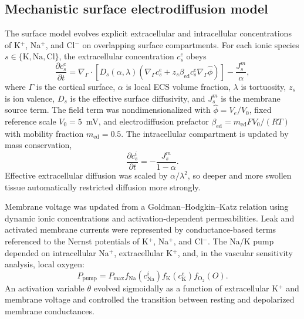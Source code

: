 \documentclass[12pt]{article}
\begin{document}
\subsection{Mechanistic surface electrodiffusion model}

The surface model evolves explicit extracellular and intracellular concentrations of K$^+$, Na$^+$, and Cl$^-$ on overlapping surface compartments. For each ionic species $s \in \{\mathrm{K},\mathrm{Na},\mathrm{Cl}\}$, the extracellular concentration $c_s^{e}$ obeys
\begin{equation}
\frac{\partial c_s^{e}}{\partial t}
= \nabla_{\Gamma}\cdot\left[D_s(\alpha,\lambda)\left(\nabla_{\Gamma} c_s^{e} + z_s \beta_{\mathrm{ed}} c_s^{e}\nabla_{\Gamma}\hat{\phi}\right)\right]
- \frac{J_s^{m}}{\alpha},
\end{equation}
where $\Gamma$ is the cortical surface, $\alpha$ is local ECS volume fraction, $\lambda$ is tortuosity, $z_s$ is ion valence, $D_s$ is the effective surface diffusivity, and $J_s^{m}$ is the membrane source term. The field term was nondimensionalized with $\hat{\phi}=V_e/V_0$, fixed reference scale $V_0=5$~mV, and electrodiffusion prefactor $\beta_{\mathrm{ed}} = m_{\mathrm{ed}} F V_0 /(RT)$ with mobility fraction $m_{\mathrm{ed}}=0.5$. The intracellular compartment is updated by mass conservation,
\begin{equation}
\frac{\partial c_s^{i}}{\partial t} = -\frac{J_s^{m}}{1-\alpha}.
\end{equation}
Effective extracellular diffusion was scaled by $\alpha/\lambda^2$, so deeper and more swollen tissue automatically restricted diffusion more strongly.

Membrane voltage was updated from a Goldman--Hodgkin--Katz relation using dynamic ionic concentrations and activation-dependent permeabilities. Leak and activated membrane currents were represented by conductance-based terms referenced to the Nernst potentials of K$^+$, Na$^+$, and Cl$^-$. The Na/K pump depended on intracellular Na$^+$, extracellular K$^+$, and, in the vascular sensitivity analysis, local oxygen:
\begin{equation}
P_{\mathrm{pump}} = P_{\max} f_{\mathrm{Na}}(c_{\mathrm{Na}}^{i}) f_{\mathrm{K}}(c_{\mathrm{K}}^{e}) f_{\mathrm{O}_2}(O).
\end{equation}
An activation variable $\theta$ evolved sigmoidally as a function of extracellular K$^+$ and membrane voltage and controlled the transition between resting and depolarized membrane conductances.
\end{document}
